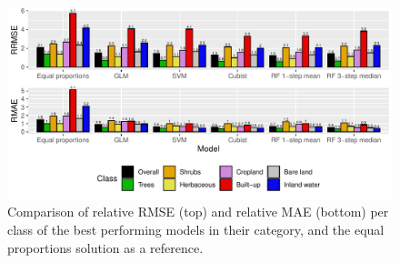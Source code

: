 \documentclass[review,authoryear,3p]{elsarticle}
\begin{document}
\begin{figure}
    \includegraphics[width=\textwidth]{article-figures/barplots/2020-11-02-model-comparison-bar}
    \caption{Comparison of relative RMSE (top) and relative MAE (bottom) per class of the best performing models in their category, and the equal proportions solution as a reference.}
    \label{fig-models-relative}
\end{figure}


\end{document}
